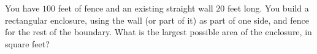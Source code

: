 You have $100$ feet of fence and an existing straight wall $20$ feet long. You build a rectangular enclosure, using the wall (or part of it) as part of one side, and fence for the rest of the boundary. What is the largest possible area of the enclosure, in square feet?
